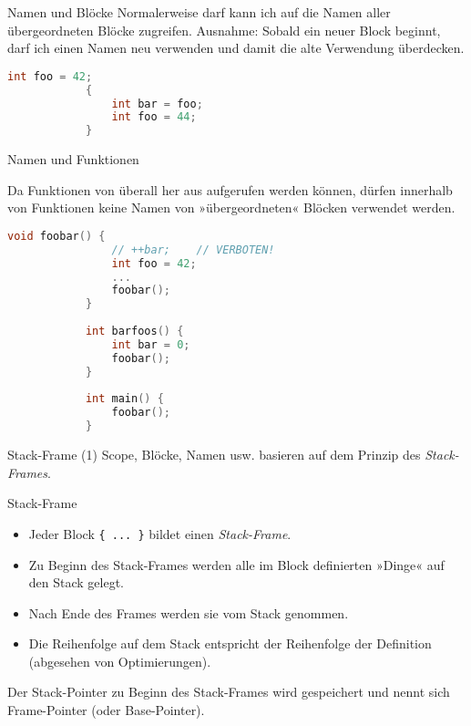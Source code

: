 \begin{frame}[fragile]{Namen und Blöcke}
	Normalerweise darf kann ich auf die Namen aller übergeordneten Blöcke zugreifen.
	{\scriptsize Ausnahme: Sobald ein neuer Block beginnt, darf ich einen Namen neu verwenden und damit die alte Verwendung überdecken.}
	
	\begin{block}{}
		\begin{lstlisting}[language=C++]
			int foo = 42;
			{
			    int bar = foo;
			    int foo = 44;
			}
		\end{lstlisting}
	\end{block}
\end{frame}

\begin{frame}[fragile]{Namen und Funktionen}
	\footnotesize
	
	Da Funktionen von überall her aus aufgerufen werden können, dürfen innerhalb von Funktionen keine Namen von »übergeordneten« Blöcken verwendet werden.
	
	\scriptsize
	\begin{block}{}
		\begin{lstlisting}[language=C++]
			void foobar() {
			    // ++bar;    // VERBOTEN!
			    int foo = 42;
			    ...
			    foobar();
			}
			
			int barfoos() {
			    int bar = 0;
			    foobar();
			}
			
			int main() {
			    foobar();
			}
		\end{lstlisting}
	\end{block}
\end{frame}

\begin{frame}[fragile]{Stack-Frame (1)}
	Scope, Blöcke, Namen usw. basieren auf dem Prinzip des \emph{Stack-Frames}.
	
	\pause
	
	\begin{block}{Stack-Frame}
		\begin{itemize}
			\item Jeder Block \verb|{ ... }| bildet einen \emph{Stack-Frame}.
			\item Zu Beginn des Stack-Frames werden alle im Block definierten »Dinge« auf den Stack gelegt.
			\item Nach Ende des Frames werden sie vom Stack genommen.
			\item Die Reihenfolge auf dem Stack entspricht der Reihenfolge der Definition {\tiny(abgesehen von Optimierungen)}.
		\end{itemize}
	\end{block}
	
	\pause
	
	Der Stack-Pointer zu Beginn des Stack-Frames wird gespeichert und nennt sich Frame-Pointer (oder Base-Pointer).
\end{frame}

